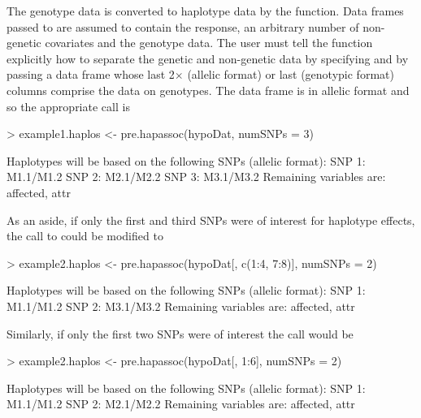 \documentclass[article, shortnames]{jss}
\begin{document}
The genotype data is converted to haplotype data by the  
function. Data frames passed to 
are assumed to contain the 
response, an arbitrary number of non-genetic covariates and the 
genotype data. The user must tell the function explicitly how to 
separate the genetic and 
non-genetic data by specifying  and by passing a data frame 
whose last 2$\times$ (allelic format) or last 
(genotypic format) columns comprise the data on genotypes. The data frame
 is in allelic format and so the appropriate call is
\begin{Schunk}
\begin{Sinput}
> example1.haplos <- pre.hapassoc(hypoDat, numSNPs = 3)
\end{Sinput}
\begin{Soutput}
Haplotypes will be based on the following SNPs (allelic format): 
 SNP 1: M1.1/M1.2
 SNP 2: M2.1/M2.2
 SNP 3: M3.1/M3.2
Remaining variables are: 
 affected, attr 
\end{Soutput}
\end{Schunk}
As an aside, if only the first and third
SNPs were of interest for haplotype effects, the call to  
 could be modified to
\begin{Schunk}
\begin{Sinput}
> example2.haplos <- pre.hapassoc(hypoDat[, c(1:4, 7:8)], numSNPs = 2)
\end{Sinput}
\begin{Soutput}
Haplotypes will be based on the following SNPs (allelic format): 
 SNP 1: M1.1/M1.2
 SNP 2: M3.1/M3.2
Remaining variables are: 
 affected, attr 
\end{Soutput}
\end{Schunk}

Similarly, if only the first two SNPs were of interest the call would be
\begin{Schunk}
\begin{Sinput}
> example2.haplos <- pre.hapassoc(hypoDat[, 1:6], numSNPs = 2)
\end{Sinput}
\begin{Soutput}
Haplotypes will be based on the following SNPs (allelic format): 
 SNP 1: M1.1/M1.2
 SNP 2: M2.1/M2.2
Remaining variables are: 
 affected, attr 
\end{Soutput}
\end{Schunk}
\end{document}
